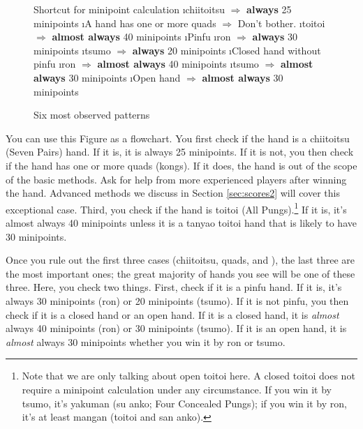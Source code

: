 \newpage

\begin{figure}[h!]
\begin{itembox}[c]{Shortcut for minipoint calculation}
\be
\i {\jap chiitoitsu} $\Rightarrow$ {\bf always} 25 minipoints
\i A hand has one or more quads $\Rightarrow$ Don't bother. %
\i {\jap toitoi} $\Rightarrow$ {\bf almost always} 40 minipoints 
\i {\jap Pinfu}
	\bi 
	\i {\jap ron} $\Rightarrow$ {\bf always} 30 minipoints
	\i {\jap tsumo} $\Rightarrow$ {\bf always} 20 minipoints
	\ei
\i Closed hand without {\jap pinfu}
	\bi 
	\i {\jap ron} $\Rightarrow$ {\bf almost always} 40 minipoints
	\i {\jap tsumo} $\Rightarrow$ {\bf almost always} 30 minipoints
	\ei
\i Open hand $\Rightarrow$ {\bf almost always} 30 minipoints
\ee
\end{itembox}
\caption{Six most observed patterns}\label{fig:mini}
\end{figure}

You can use this Figure as a flowchart. 
You first check if the hand is a {\jap chiitoitsu} (Seven Pairs) hand. If it is, it is always 25 minipoints. If it is not, you then check if the hand has one or more quads (kongs). If it does, the hand is out of the scope of the basic methods. Ask for help from more experienced players after winning the hand. Advanced methods we discuss in Section \ref{sec:scores2} will cover this exceptional case. 
Third, you check if the hand is {\jap toitoi} (All Pungs).\footnote{Note that we are only talking about open {\jap toitoi} here. A closed {\jap toitoi} does not require a minipoint calculation under any circumstance. If you win it by {\jap tsumo}, it's {\jap yakuman} ({\jap su anko}; Four Concealed Pungs); if you win it by {\jap ron}, it's at least {\jap mangan} ({\jap toitoi} and {\jap san anko}).} If it is, it's almost always 40 minipoints unless it is a {\jap tanyao toitoi} hand that is likely to have 30 minipoints.  

\bigskip
Once you rule out the first three cases ({\jap chiitoitsu}, quads, and ), the last three are the most important ones; the great majority of hands you see will be one of these three. Here, you check two things. 
First, check if it is a {\jap pinfu} hand. If it is, it's always 30 minipoints ({\jap ron}) or 20 minipoints ({\jap tsumo}). 
If it is not {\jap pinfu}, you then check if it is a closed hand or an open hand. If it is a closed hand, it is \emph{almost} always 40 minipoints ({\jap ron}) or 30 minipoints ({\jap tsumo}). If it is an open hand, it is \emph{almost} always 30 minipoints whether you win it by {\jap ron} or {\jap tsumo}. 

